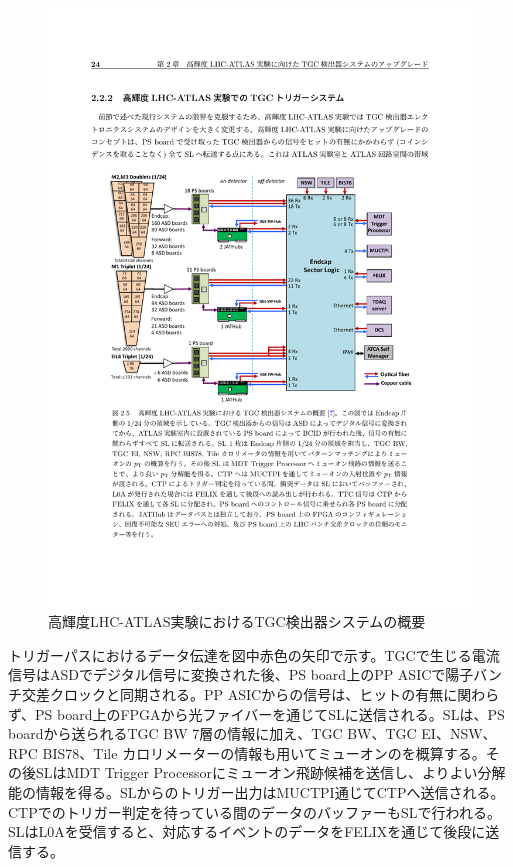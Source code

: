 \begin{figure} 
\centering
\includegraphics[width=16cm]{fig/Intro/TGC_phase2tdaq.pdf}
\caption[高輝度LHC-ATLAS実験におけるTGC検出器システムの概要]{高輝度LHC-ATLAS実験におけるTGC検出器システムの概要\cite{tdr_phase2muon_2017017}}
\label{TGC_phase2tdaq}
\end{figure}

トリガーパスにおけるデータ伝達を図中赤色の矢印で示す。TGCで生じる電流信号はASDでデジタル信号に変換された後、PS board上のPP ASICで陽子バンチ交差クロックと同期される。PP ASICからの信号は、ヒットの有無に関わらず、PS board上のFPGAから光ファイバーを通じてSLに送信される。SLは、PS boardから送られるTGC BW 7層の情報に加え、TGC BW、TGC EI、NSW、RPC BIS78、Tile カロリメーターの情報も用いてミューオンの\pt を概算する。その後SLはMDT Trigger Processorにミューオン飛跡候補を送信し、よりよい\pt 分解能の情報を得る。SLからのトリガー出力はMUCTPI通じてCTPへ送信される。CTPでのトリガー判定を待っている間のデータのバッファーもSLで行われる。SLはL0Aを受信すると、対応するイベントのデータをFELIXを通じて後段に送信する。


